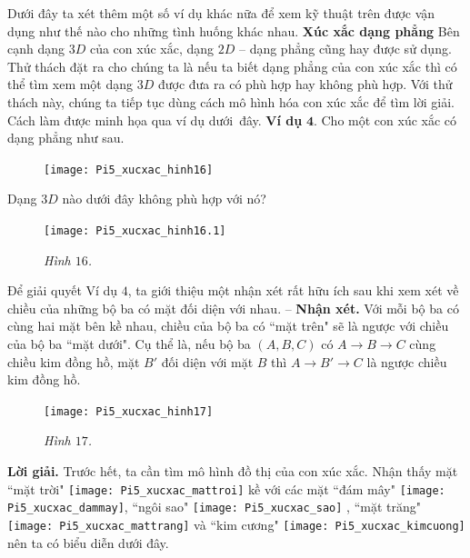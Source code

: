 \begin{multicols}{2}
\begin{figure}[H]
		\vspace*{-10pt}
	\end{figure}
	Dưới đây ta xét thêm một số ví dụ khác nữa để xem kỹ thuật trên được vận dụng như thế nào cho những tình huống khác nhau. 
	\vskip 0.1cm
	\textbf{\color{toancuabi}Xúc xắc dạng phẳng}
	\vskip 0.1cm
	Bên cạnh dạng $3D$ của con xúc xắc, dạng $2D$ -- dạng phẳng cũng hay được sử dụng. Thử thách đặt ra cho chúng ta là nếu ta biết dạng phẳng của con xúc xắc thì có thể tìm xem một dạng $3D$ được đưa ra có phù hợp hay không phù hợp. Với thử thách này, chúng ta tiếp tục dùng cách mô hình hóa con xúc xắc để tìm lời giải. Cách làm được minh họa qua ví dụ dưới~đây.
	\vskip 0.1cm
	\textbf{\color{toancuabi}Ví dụ} $\pmb{4.}$ Cho một con xúc xắc có dạng phẳng như sau.
	\begin{figure}[H]
		\vspace*{-5pt}
		\centering
		\captionsetup{labelformat= empty, justification=centering}
		\texttt{[image: Pi5\_xucxac\_hinh16]}
		\vspace*{-15pt}
	\end{figure}
	Dạng $3D$ nào dưới đây không phù hợp với nó?
	 \begin{figure}[H]
	 	\vspace*{-5pt}
	 	\centering
	 	\captionsetup{labelformat= empty, justification=centering}
	 	\texttt{[image: Pi5\_xucxac\_hinh16.1]}
	 	\caption{\small\textit{\color{toancuabi}Hình $16$.}}
	 	\vspace*{-10pt}
	 \end{figure}
	Để giải quyết Ví dụ $4$, ta giới thiệu một nhận xét rất hữu ích sau khi xem xét về chiều của những bộ ba có mặt đối diện với nhau.
	\vskip 0.1cm
	-- \textbf{\color{toancuabi}Nhận xét.}  Với mỗi bộ ba có cùng hai mặt bên kề nhau, chiều của bộ ba có ``mặt trên" sẽ là ngược với chiều của bộ ba ``mặt dưới". Cụ thể là, nếu bộ ba $(A, B, C)$ có $A \to B \to C$ cùng chiều kim đồng hồ, mặt $B'$ đối diện với mặt $B$ thì $A \to B' \to C$ là ngược chiều kim đồng hồ.
	\begin{figure}[H]
		\vspace*{-5pt}
		\centering
		\captionsetup{labelformat= empty, justification=centering}
		\texttt{[image: Pi5\_xucxac\_hinh17]}
		\caption{\small\textit{\color{toancuabi}Hình $17$.}}
		\vspace*{-10pt}
	\end{figure}
	\textbf{\color{toancuabi}Lời giải.} 
	Trước hết, ta cần tìm mô hình đồ thị của con xúc xắc. Nhận thấy mặt ``mặt trời" \texttt{[image: Pi5\_xucxac\_mattroi]} kề với các mặt ``đám mây"   \texttt{[image: Pi5\_xucxac\_dammay]}, ``ngôi sao" \texttt{[image: Pi5\_xucxac\_sao]} , ``mặt trăng" \texttt{[image: Pi5\_xucxac\_mattrang]}  và ``kim cương" \texttt{[image: Pi5\_xucxac\_kimcuong]} nên ta có biểu diễn dưới đây.

\end{multicols}
